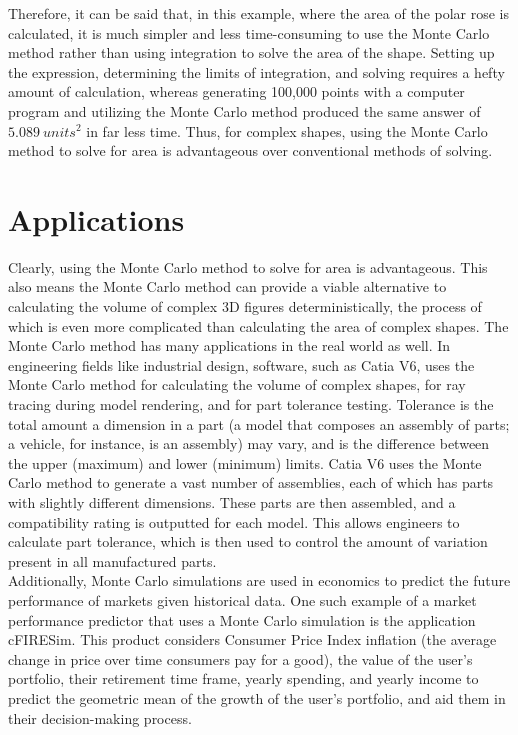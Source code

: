 \documentclass[11pt]{article}
\begin{document}
Therefore, it can be said that, in this example, where the area of the polar rose is calculated, it is much simpler and less time-consuming to use the Monte Carlo method rather than using integration to solve the area of the shape. Setting up the expression, determining the limits of integration, and solving requires a hefty amount of calculation, whereas generating 100,000 points with a computer program and utilizing the Monte Carlo method produced the same answer of $5.089 \ units^2$ in far less time. Thus, for complex shapes, using the Monte Carlo method to solve for area is advantageous over conventional methods of solving.

\section{Applications}

Clearly, using the Monte Carlo method to solve for area is advantageous. This also means the Monte Carlo method can provide a viable alternative to calculating the volume of complex 3D figures deterministically, the process of which is even more complicated than calculating the area of complex shapes. The Monte Carlo method has many applications in the real world as well. In engineering fields like industrial design, software, such as Catia V6, uses the Monte Carlo method for calculating the volume of complex shapes, for ray tracing during model rendering, and for part tolerance testing. Tolerance is the total amount a dimension in a part (a model that composes an assembly of parts; a vehicle, for instance, is an assembly) may vary, and is the difference between the upper (maximum) and lower (minimum) limits. Catia V6 uses the Monte Carlo method to  generate a vast number of assemblies, each of which has parts with slightly different dimensions. These parts are then assembled, and a compatibility rating is outputted for each model. This allows engineers to calculate part tolerance,  which is then used to control the amount of variation present in all manufactured parts.\cite{catia}\\[3ex]

Additionally, Monte Carlo simulations are used in economics to predict the future performance of markets given historical data. One such example of a market performance predictor that uses a Monte Carlo simulation is the application cFIRESim. This product considers Consumer Price Index inflation (the average change in price over time consumers pay for a good), the value of the user's portfolio, their retirement time frame, yearly spending, and yearly income \cite{cfiresim} to predict the geometric mean of the growth of the user's portfolio, and aid them in their decision-making process.  
\end{document}

